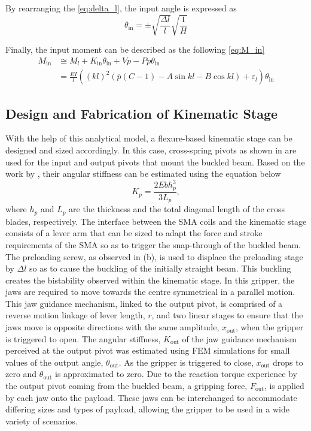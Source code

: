 By rearranging the \cref{eq:delta_l}, the input angle is expressed as
\begin{equation}\label{eq:theta_in}
 {\theta}_\textrm{in}=\pm \sqrt{\frac{\Delta l}{l}}\sqrt{\frac{1}{H}}
\end{equation}

Finally, the input moment can be described as the following \cref{eq:M_in}
\begin{equation}
\begin{split}
 M_\textrm{in} &\cong M_l+K_\textrm{in}{\theta }_\textrm{in}+Vp-Pp{\theta}_\textrm{in}\\
 &=\frac{EI}{l}\left({\left(kl\right)}^2\left(\overline{p}\left(C-1\right)-A\sin{kl}-B\cos{kl}\right)+{\varepsilon }_l\right){\theta}_\textrm{in}
 \label{eq:M_in}
\end{split}
\end{equation}

\subsection{Design and Fabrication of Kinematic Stage}
With the help of this analytical model, a flexure-based kinematic stage can be designed and sized accordingly. In this case, cross-spring pivots as shown in \todocite are used for the input and output pivots that mount the buckled beam. Based on the work by \todocite, their angular stiffness can be estimated using the equation below
\begin{equation}
    K_p = \frac{2Ebh_p^3}{3L_p},
\end{equation}
where $h_p$ and $L_p$ are the thickness and the total diagonal length of the cross blades, respectively. The interface between the SMA coils and the kinematic stage consists of a lever arm that can be sized to adapt the force and stroke requirements of the SMA so as to trigger the snap-through of the buckled beam. The preloading screw, as observed in \todocite (b), is used to displace the preloading stage by $\Delta l$ so as to cause the buckling of the initially straight beam. This buckling creates the bistability observed within the kinematic stage. In this gripper, the jaws are required to move towards the centre symmetrical in a parallel motion. This jaw guidance mechanism, linked to the output pivot, is comprised of a reverse motion linkage of lever length, $r$, and two linear stages to ensure that the jaws move is opposite directions with the same amplitude, $x_\textrm{out}$, when the gripper is triggered to open. The angular stiffness, $K_\textrm{out}$ of the jaw guidance mechanism perceived at the output pivot was estimated using FEM simulations for small values of the output angle, $\theta_\mathrm{out}$. As the gripper is triggered to close, $x_\textrm{out}$ drops to zero and $\theta_\mathrm{out}$ is approximated to zero. Due to the reaction torque experience by the output pivot coming from the buckled beam, a gripping force, $F_\textrm{out}$, is applied by each jaw onto the payload. These jaws can be interchanged to accommodate differing sizes and types of payload, allowing the gripper to be used in a wide variety of scenarios.

